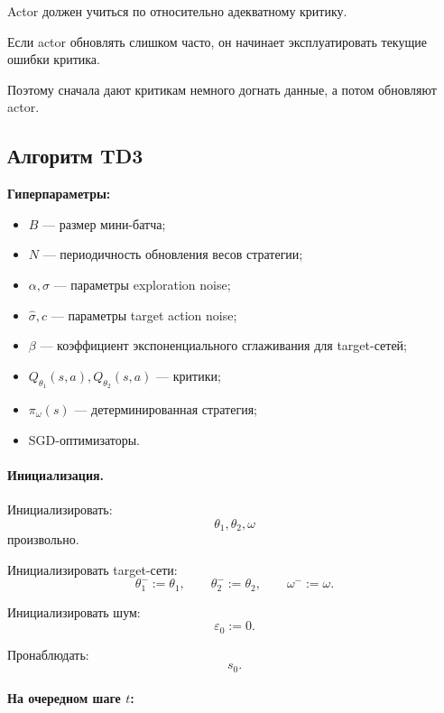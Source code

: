 \documentclass[12pt,a4paper]{article}
\begin{document}
Actor должен учиться по относительно адекватному критику.

Если actor обновлять слишком часто, он начинает эксплуатировать текущие ошибки критика.

Поэтому сначала дают критикам немного догнать данные, а потом обновляют actor.

\subsection{Алгоритм TD3}

\textbf{Гиперпараметры:}

\begin{itemize}
    \item $B$ --- размер мини-батча;
    \item $N$ --- периодичность обновления весов стратегии;
    \item $\alpha,\sigma$ --- параметры exploration noise;
    \item $\hat\sigma,c$ --- параметры target action noise;
    \item $\beta$ --- коэффициент экспоненциального сглаживания для target-сетей;
    \item $Q_{\theta_1}(s,a),Q_{\theta_2}(s,a)$ --- критики;
    \item $\pi_\omega(s)$ --- детерминированная стратегия;
    \item SGD-оптимизаторы.
\end{itemize}

\paragraph{Инициализация.}

Инициализировать:
\[
\theta_1,\theta_2,\omega
\]
произвольно.

Инициализировать target-сети:
\[
\theta_1^-:=\theta_1,
\qquad
\theta_2^-:=\theta_2,
\qquad
\omega^-:=\omega.
\]

Инициализировать шум:
\[
\varepsilon_0:=0.
\]

Пронаблюдать:
\[
s_0.
\]

\paragraph{На очередном шаге $t$:}
\end{document}
